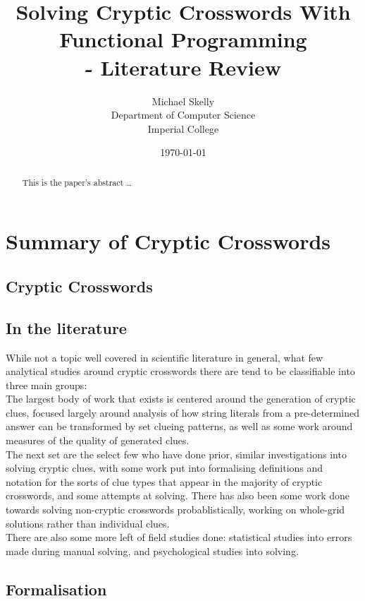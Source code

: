 \documentclass[12pt]{article}
\title{Solving Cryptic Crosswords With Functional Programming \\ - Literature Review}
\author{
        Michael Skelly \\
        Department of Computer Science\\
        Imperial College
}
\date{\today}
\begin{document}
\maketitle

\begin{abstract}
This is the paper's abstract \ldots
\end{abstract}

\section{Summary of Cryptic Crosswords }

\subsection{Cryptic Crosswords}

\subsection{In the literature}
While not a topic well covered in scientific literature in general, what few analytical studies around cryptic crosswords there are tend to be classifiable into three main groups:\\

The largest body of work that exists is centered around the generation of cryptic clues, focused largely around analysis of how string literals from a pre-determined answer can be transformed by set clueing patterns, as well as some work around measures of the quality of generated clues. \\

The next set are the select few who have done prior, similar investigations into solving cryptic clues, with some work put into formalising definitions and notation for the sorts of clue types that appear in the majority of cryptic crosswords, and some attempts at solving. There has also been some work done towards solving non-cryptic crosswords probablistically, working on whole-grid solutions rather than individual clues.\\

There are also some more left of field studies done: statistical studies into errors made during manual solving, and psychological studies into solving.  

\subsection{Formalisation}
\end{document}

